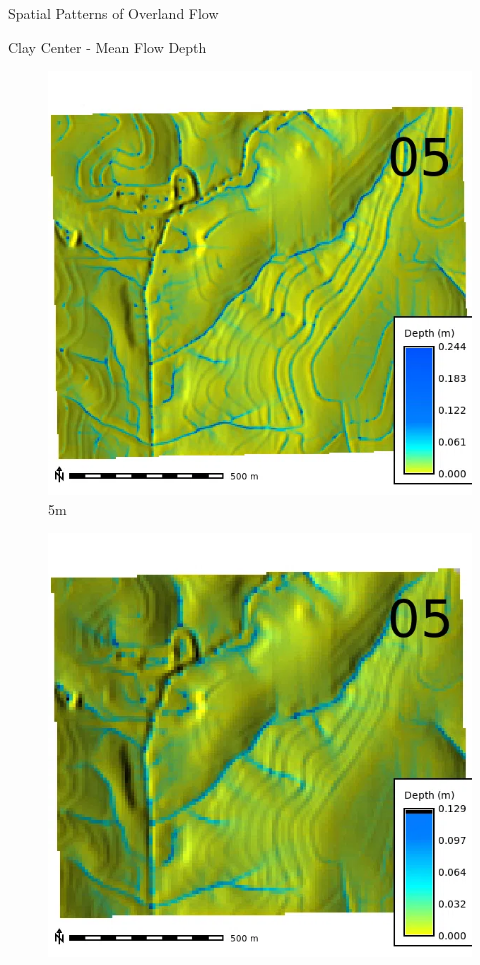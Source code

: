 \documentclass[
  ignorenonframetext,
]{beamer}
\begin{document}
\begin{frame}{Spatial Patterns of Overland Flow}
\begin{block}{Clay Center - Mean Flow Depth}
\begin{figure}[H]
{\centering \includegraphics{../output/clay-center/sensitivity_1/clay-center_depth_5_025_s_average.webp}

}

\caption{5m}

\end{figure}%

\begin{figure}[H]

{\centering \includegraphics{../output/clay-center/sensitivity_1/clay-center_depth_10_025_s_average.webp}

}
\end{figure}
\end{block}
\end{frame}
\end{document}
